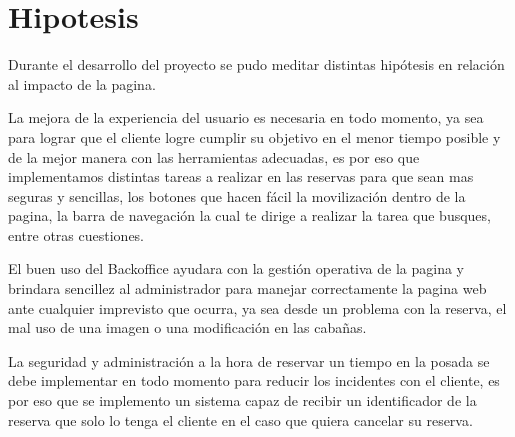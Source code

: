 \section{Hipotesis}

Durante el desarrollo del proyecto se pudo meditar distintas hipótesis en relación al impacto de la pagina.

La mejora de la experiencia del usuario es necesaria en todo momento, ya sea para lograr que el cliente logre cumplir su objetivo en el menor tiempo posible y de la mejor manera con las herramientas adecuadas, es por eso que implementamos distintas tareas a realizar en las reservas para que sean mas seguras y sencillas, los botones que hacen fácil la movilización dentro de la pagina, la barra de navegación la cual te dirige a realizar la tarea que busques, entre otras cuestiones.

El buen uso del Backoffice ayudara con la gestión operativa de la pagina y brindara sencillez al administrador para manejar correctamente la pagina web ante cualquier imprevisto que ocurra, ya sea desde un problema con la reserva, el mal uso de una imagen o una modificación en las cabañas.

La seguridad y administración a la hora de reservar un tiempo en la posada se debe implementar en todo momento para reducir los incidentes con el cliente, es por eso que se implemento un sistema capaz de recibir un identificador de la reserva que solo lo tenga el cliente en el caso que quiera cancelar su reserva.

